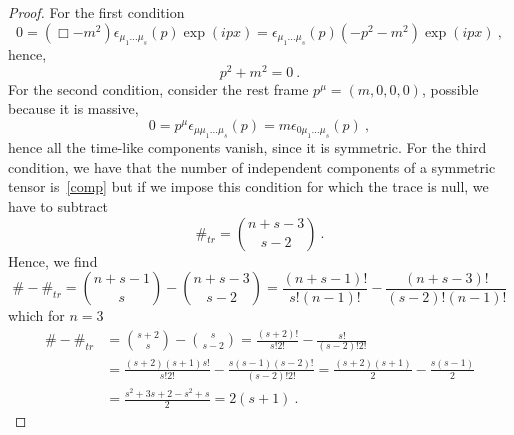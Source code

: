     \begin{proof}
        For the first condition 
        \begin{equation*}
            0 = (\Box - m^2) \epsilon_{\mu_1 \ldots \mu_s} (p) \exp(i p x) = \epsilon_{\mu_1 \ldots \mu_s} (p) (- p^2 - m^2) \exp(i p x) ~,
        \end{equation*} 
        hence, 
        \begin{equation*}
            p^2 + m^2 = 0 ~.
        \end{equation*}
        For the second condition, consider the rest frame $p^\mu = (m,0,0,0)$, possible because it is massive,
        \begin{equation*}
            0 = p^\mu \epsilon_{\mu \mu_1 \ldots \mu_s} (p) = m \epsilon_{0 \mu_1 \ldots \mu_s} (p) ~,
        \end{equation*}
        hence all the time-like components vanish, since it is symmetric. For the third condition, we have that the number of independent components of a symmetric tensor is~\eqref{comp} but if we impose this condition for which the trace is null, we have to subtract 
        \begin{equation*}
            \#_{tr} = \binom{n+s-3}{s-2} ~.
        \end{equation*}
        Hence, we find
        \begin{equation*}
            \# - \#_{tr} = \binom{n+s-1}{s} - \binom{n+s-3}{s-2} = \frac{(n+s-1)!}{s! (n-1)!} - \frac{(n+s-3)!}{(s-2)! (n-1)!} 
        \end{equation*}
        which for $n=3$
        \begin{equation*}
        \begin{aligned}
            \# - \#_{tr} & = \binom{s+2}{s} - \binom{s}{s-2} = \frac{(s+2)!}{s!2!} - \frac{s!}{(s-2)!2!} \\ & =  \frac{(s+2)(s+1)s!}{s!2!} - \frac{s(s-1)(s-2)!}{(s-2)!2!} = \frac{(s+2)(s+1)}{2} - \frac{s(s-1)}{2} \\ & = \frac{s^2 + 3s + 2 - s^2 + s}{2} = 2 (s + 1) ~.
        \end{aligned}
        \end{equation*}
    \end{proof}

